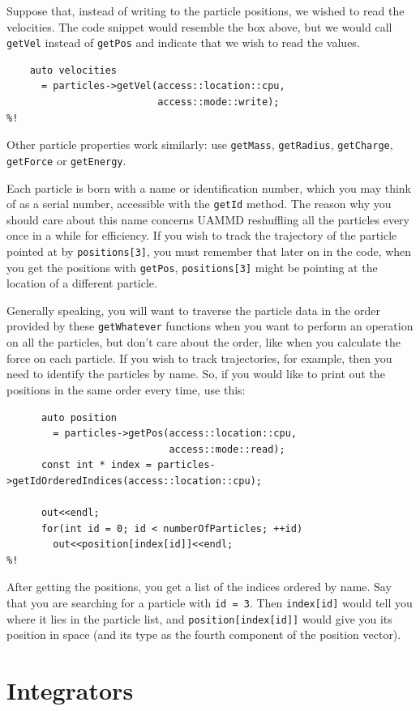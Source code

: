 Suppose that, instead of writing to the particle positions, we wished to read
the velocities. The code snippet would resemble the box above, but we would call
\texttt{getVel} instead of \texttt{getPos} and indicate that we wish to read the
values.
\begin{lstlisting}
    auto velocities
      = particles->getVel(access::location::cpu,
                          access::mode::write);
%!
\end{lstlisting}
Other particle properties work similarly: use \texttt{getMass},
\texttt{getRadius}, \texttt{getCharge}, \texttt{getForce} or \texttt{getEnergy}.

Each particle is born with a name or identification number, which you may think
of as a serial number, accessible with the \texttt{getId} method. The reason why
you should care about this name concerns UAMMD reshuffling all the particles
every once in a while for efficiency. If you wish to track the trajectory of the
particle pointed at by \texttt{positions[3]}, you must remember that later on in
the code, when you get the positions with \texttt{getPos}, \texttt{positions[3]}
might be pointing at the location of a different particle.

Generally speaking, you will want to traverse the particle data in the order
provided by these \texttt{getWhatever} functions when you want to perform an
operation on all the particles, but don't care about the order, like when you
calculate the force on each particle. If you wish to track trajectories, for
example, then you need to identify the particles by name. So, if you would
like to print out the positions in the same order every time, use this:
\label{particlePositions}
\begin{lstlisting}
      auto position
        = particles->getPos(access::location::cpu,
                            access::mode::read);
      const int * index = particles->getIdOrderedIndices(access::location::cpu);

      out<<endl;
      for(int id = 0; id < numberOfParticles; ++id)
        out<<position[index[id]]<<endl;
%!
\end{lstlisting}
After getting the positions, you get a list of the indices ordered by name. Say
that you are searching for a particle with \texttt{id = 3}. Then
\texttt{index[id]} would tell you where it lies in the particle list, and
\texttt{position[index[id]]} would give you its position in space (and its type
as the fourth component of the position vector).

\section{Integrators}

